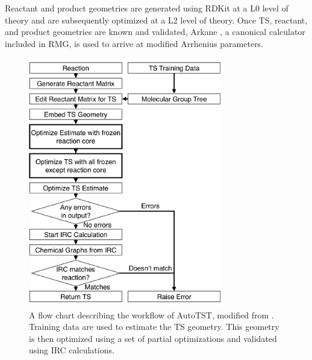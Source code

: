 \documentclass[preprint, 11pt]{elsarticle} %
\begin{document}
Reactant and product geometries are generated using RDKit at a L0 level of theory and are subsequently optimized at a L2 level of theory. 
Once TS, reactant, and product geometries are known and validated, Arkane \cite{gao:2016}, a canonical calculator included in RMG, is used to arrive at modified Arrhenius parameters.


\begin{figure}[h!]
    \centering
    \includegraphics[width=0.75\textwidth]{autotst_overview}
    \caption{A flow chart describing the workflow of AutoTST, modified from \cite{bhoorasingh:2017}. Training data are used to estimate the TS geometry. This geometry is then optimized using a set of partial optimizations and validated using IRC calculations.}
    \label{fig:autotst-overview}
\end{figure}


\end{document}
